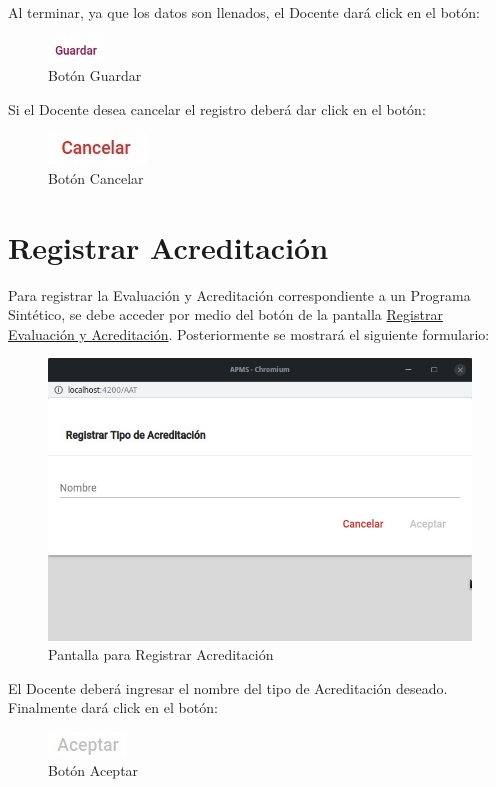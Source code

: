 Al terminar, ya que los datos son llenados, el Docente dará click en el botón:

\begin{figure}[H]
    \centering
    \includegraphics[width=0.1\linewidth]{images/SP6/BotonGuardar.jpeg}
    \caption{Botón Guardar}
\end{figure}

Si el Docente desea cancelar el registro deberá dar click en el botón:

\begin{figure}[H]
    \centering
    \includegraphics[width=0.1\linewidth]{images/SP6/BotonCancelar.jpeg}
    \caption{Botón Cancelar}
\end{figure}


\pagebreak
\hypertarget{RegAcre}{\section{Registrar Acreditación}}


Para registrar la Evaluación y Acreditación correspondiente a un Programa Sintético, se debe acceder por medio del botón  de la pantalla \hyperlink{RegistrarEC}{Registrar Evaluación y Acreditación}. Posteriormente se mostrará el siguiente formulario:


\begin{figure}[!h]
    \centering
    \hypertarget{RegistrarAcreditacion}{\includegraphics[width=0.5\linewidth]{images/SP6/9.jpeg}}
    \caption{Pantalla para Registrar Acreditación}
\end{figure}

El Docente deberá ingresar el nombre del tipo de Acreditación deseado. Finalmente dará click en el botón:

\begin{figure}[H]
    \centering
    \includegraphics[width=0.1\linewidth]{images/SP6/BotonAceptar.jpeg}
    \caption{Botón Aceptar}
\end{figure}

